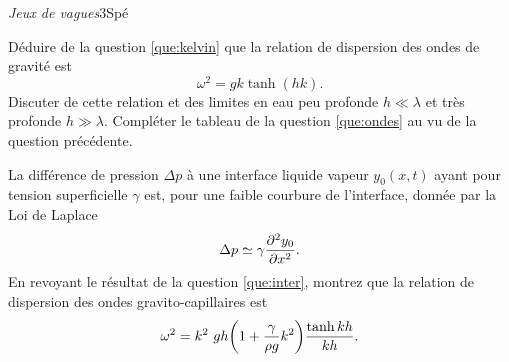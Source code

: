 \begin{exercise}{\textit{Jeux de vagues}}{3}{Spé}
\begin{questions}
    \question Déduire de la question \ref{que:kelvin} que la relation de dispersion des ondes de gravité est
    $$\omega^2 = gk\tanh(hk).$$
    Discuter de cette relation et des limites en eau peu profonde $h \ll \lambda$ et très profonde $h \gg \lambda$.
    \question Compléter le tableau de la question \ref{que:ondes} au vu de la question précédente.
\end{questions}
La différence de pression $\Delta p$ à une interface liquide vapeur $y_0(x,t)$ ayant pour tension superficielle $\gamma$ est, pour une faible courbure de l'interface, donnée par la Loi de Laplace
$$\Delta p \simeq \gamma \pdv[2]{y_0}{x}.\vspace{-0.5em}$$
En revoyant le résultat de la question \ref{que:inter}, montrez que la relation de dispersion des ondes gravito-capillaires est\vspace*{-2ex}
$$\omega^2 = k^2 \ gh\qty(1 + \dfrac{\gamma }{\rho g}k^2)\dfrac{\tanh{kh}}{kh}.$$

\end{exercise}